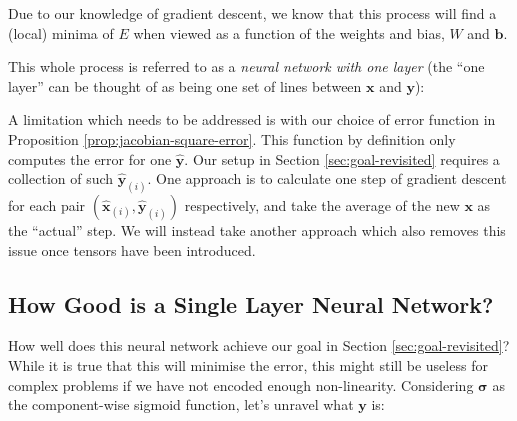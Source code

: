 \documentclass[a4paper]{article}
\theoremstyle{plain} %
\theoremstyle{definition} %
\numberwithin{equation}{subsection}
\newcommand{\vx}{{\textbf{x}}}
\newcommand{\vy}{{\textbf{y}}}
\newcommand{\vb}{{\textbf{b}}}
\newcommand{\vsigma}{{\bm{\sigma}}} %
\newcommand{\vxh}{{\widehat{\textbf{x}}}}
\newcommand{\vyh}{{\widehat{\textbf{y}}}}
\begin{document}
Due to our knowledge of gradient descent, we know that this process will find a (local) minima of 
$E$ when viewed as a function of the weights and bias, $W$ and $\vb$.

This whole process is referred to as a \emph{neural network with one layer} (the ``one layer'' can be thought of as being one set of lines between $\vx$ and $\vy$):

\begin{center}
\end{center}


A limitation which needs to be addressed is with our choice of error function in Proposition \ref{prop:jacobian-square-error}. 
This function by definition only computes the error for one $\vyh$. Our setup in Section \ref{sec:goal-revisited} requires a collection of such $\vyh_{(i)}$. 
One approach is to calculate one step of gradient descent for each pair $(\vxh_{(i)}, \vyh_{(i)})$ respectively, and take the average of the new $\vx$ as the ``actual'' step.
We will instead take another approach which also removes this issue once tensors have been introduced.

\subsection{How Good is a Single Layer Neural Network?}
How well does this neural network achieve our goal in Section \ref{sec:goal-revisited}? While it is true that this will minimise the error, this might still be 
useless for complex problems if we have not encoded enough non-linearity. Considering $\vsigma$ as the component-wise sigmoid function, 
let's unravel what $\vy$ is:
\end{document}
